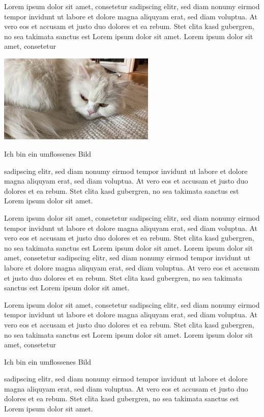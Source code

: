 \documentclass[12pt,ngerman]{scrartcl}
\begin{document}
\listoffigures

\vspace*{3cm}


Lorem ipsum dolor sit amet, consetetur sadipscing elitr, sed diam
nonumy eirmod tempor invidunt ut labore et dolore magna aliquyam erat, sed diam voluptua. At vero eos et accusam et justo duo dolores et ea rebum. Stet clita kasd gubergren, no sea takimata sanctus est Lorem ipsum dolor sit amet. Lorem ipsum dolor sit amet, consetetur
\begin{floatingfigure}{0.5\textwidth}%
  \includegraphics[width=7.5cm]{miau.jpg}
  \caption{Ich bin ein umflossenes Bild}
\end{floatingfigure}%
 sadipscing elitr, sed diam nonumy eirmod tempor invidunt ut labore et dolore magna aliquyam erat, sed diam voluptua. At vero eos et accusam et justo duo dolores et ea rebum. Stet clita kasd gubergren, no sea takimata sanctus est Lorem ipsum dolor sit amet.

Lorem ipsum dolor sit amet, consetetur sadipscing elitr, sed diam nonumy eirmod tempor invidunt ut labore et dolore magna aliquyam erat, sed diam voluptua. At vero eos et accusam et justo duo dolores et ea rebum. Stet clita kasd gubergren, no sea takimata sanctus est Lorem ipsum dolor sit amet. Lorem ipsum dolor sit amet, consetetur sadipscing elitr, sed diam nonumy eirmod tempor invidunt ut labore et dolore magna aliquyam erat, sed diam voluptua. At vero eos et accusam et justo duo dolores et ea rebum. Stet clita kasd gubergren, no sea takimata sanctus est Lorem ipsum dolor sit amet.

Lorem ipsum dolor sit amet, consetetur sadipscing elitr, sed diam
nonumy eirmod tempor invidunt ut labore et dolore magna aliquyam erat, sed diam voluptua. At vero eos et accusam et justo duo dolores et ea rebum. Stet clita kasd gubergren, no sea takimata sanctus est Lorem ipsum dolor sit amet. Lorem ipsum dolor sit amet, consetetur
\begin{floatingfigure}{0.5\textwidth}%
  \caption{Ich bin ein umflossenes Bild}
\end{floatingfigure}%
 sadipscing elitr, sed diam nonumy eirmod tempor invidunt ut labore et dolore magna aliquyam erat, sed diam voluptua. At vero eos et accusam et justo duo dolores et ea rebum. Stet clita kasd gubergren, no sea takimata sanctus est Lorem ipsum dolor sit amet.
\end{document}
